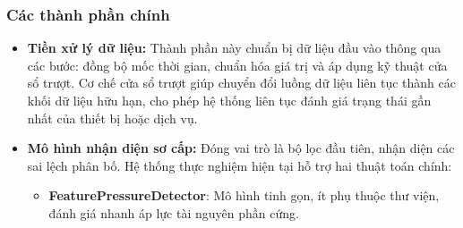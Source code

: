 \subsubsection{Các thành phần chính}
\begin{itemize}[label=--]
    \item \textbf{Tiền xử lý dữ liệu:} Thành phần này chuẩn bị dữ liệu đầu vào thông qua các bước: đồng bộ mốc thời gian, chuẩn hóa giá trị và áp dụng kỹ thuật cửa sổ trượt. Cơ chế cửa sổ trượt giúp chuyển đổi luồng dữ liệu liên tục thành các khối dữ liệu hữu hạn, cho phép hệ thống liên tục đánh giá trạng thái gần nhất của thiết bị hoặc dịch vụ.
    \item \textbf{Mô hình nhận diện sơ cấp:} Đóng vai trò là bộ lọc đầu tiên, nhận diện các sai lệch phân bố. Hệ thống thực nghiệm hiện tại hỗ trợ hai thuật toán chính:
    \begin{itemize}
        \item \textbf{FeaturePressureDetector}: Mô hình tinh gọn, ít phụ thuộc thư viện, đánh giá nhanh áp lực tài nguyên phần cứng.


\end{itemize}
\end{itemize}
